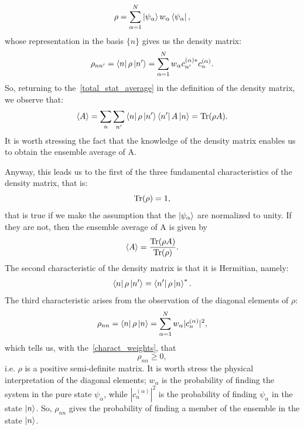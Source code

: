 \begin{equation}
    \rho = \sum_{\alpha = 1}^N \ket{\psi_\alpha} w_\alpha \bra{\psi_\alpha},
\end{equation}
whose representation in the basis $\{n\}$ gives us the density matrix:
\begin{equation}
    \rho_{nn'} = \bra{n}\rho\ket{n'} = \sum_{\alpha = 1}^N w_\alpha c_{n'}^{(\alpha)*} c_n^{(\alpha)}.
\end{equation}
So, returning to the~\ref{total_stat_average} in the definition of the density matrix, we observe that:
\begin{equation*}
    \braket{A} = \sum_n \sum_{n'} \bra{n}\rho\ket{n'}\bra{n'}A\ket{n} = \operatorname{Tr}({\rho A}).
\end{equation*}
It is worth stressing the fact that the knowledge of the density matrix enables us to obtain the ensemble average of A.

Anyway, this leads us to the first of the three fundamental characteristics of the density matrix, that is:
\begin{equation}
    \operatorname{Tr}(\rho) = 1,
\end{equation}
that is true if we make the assumption that the $\ket{\psi_\alpha}$ are normalized to unity. If they are not, then the ensemble average of A is given by
\begin{equation}
    \braket{A} = \frac{\operatorname{Tr}(\rho A)}{\operatorname{Tr}(\rho)}.
\end{equation}
The second characteristic of the density matrix is that it is Hermitian, namely:
\begin{equation}
    \bra{n}\rho\ket{n'} = \bra{n'}\rho\ket{n}^*.
\end{equation}
The third characteristic arises from the observation of the diagonal elements of $\rho$:
\begin{equation}
    \rho_{nn} = \bra{n}\rho\ket{n} = \sum_{\alpha = 1}^N w_\alpha |c_{n}^{(\alpha)}|^2,
\end{equation}
which tells us, with the~\ref{charact_weights}, that
\begin{equation}
    \rho_{nn} \geq 0,
\end{equation}
i.e. $\rho$ is a positive semi-definite matrix.
It is worth stress the physical interpretation of the diagonal elements; $w_\alpha$ is the probability of finding the system in the pure state $\psi_\alpha$, while $|c_{n}^{(\alpha)}|^2$ is the probability of finding $\psi_\alpha$ in the state $\ket{n}$. So, $\rho_{nn}$ gives the probability of finding a member of the ensemble in the state $\ket{n}$.

